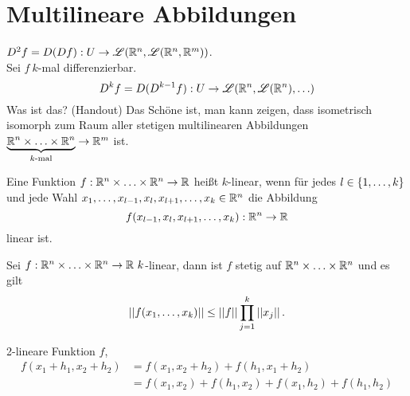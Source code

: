 \documentclass[../ana2u.tex]{subfiles}
\begin{document}
\setcounter{section}{9}
\section{Multilineare Abbildungen}
\( D^2 f = D(Df):U\rightarrow \mathscr{L}(\mathbb{R}^n, \mathscr{L}(\mathbb{R}^n, \mathbb{R}^m)) \).\\
Sei \(f\ k\)-mal differenzierbar. 
\[ D^k f = D(D^{k-1} f) : U \rightarrow \mathscr{L}(\mathbb{R}^n, \mathscr{L}(\mathbb{R}^n), \ldots) \]
Was ist das? (Handout)
Das Schöne ist, man kann zeigen, dass 
isometrisch isomorph zum Raum aller stetigen multilinearen 
Abbildungen \( \underbrace{\mathbb{R}^n \times \ldots \times \mathbb{R}^n}_{k\text{-mal}} 
\rightarrow \mathbb{R}^m \) ist.

\begin{defi*}
    Eine Funktion \(f:\mathbb{R}^n\times \ldots \times \mathbb{R}^n\rightarrow \mathbb{R}\) heißt \(k\)-linear,
    wenn für jedes \(l \in \{1,\ldots,k\}\) und jede Wahl 
    \(x_1, \ldots, x_{l-1}, x_l, x_{l+1}, \ldots, x_k \in \mathbb{R}^n\)
    die Abbildung
    \[ f(x_{l-1}, x_l, x_{l+1}, \ldots, x_k):\mathbb{R}^n\rightarrow \mathbb{R} \]
    linear ist.    
\end{defi*}
\begin{satz*}
    Sei \( f:\mathbb{R}^n \times \ldots \times \mathbb{R}^n\rightarrow \mathbb{R}\ k \)-linear, 
    dann ist \(f\) stetig auf \( \mathbb{R}^n \times \ldots \times \mathbb{R}^n \) 
    und es gilt 
    \[ \left|\left| f(x_1, \ldots, x_k) \right|\right| 
    \leq \left|\left|f\right|\right| \prod_{j=1}^k \left|\left|x_j\right|\right|. \]
\end{satz*}
\begin{bsp}
    2-lineare Funktion \(f\),
    \begin{align*}
        f(x_1+h_1, x_2+h_2) &= f(x_1, x_2+h_2) + f(h_1, x_1 +h_2)\\
        &= f(x_1, x_2) + f(h_1, x_2) + f(x_1, h_2) + f(h_1, h_2)
    \end{align*}
\end{bsp}
\end{document}

